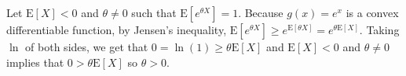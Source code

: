 \documentclass[12pt]{article}
\newcommand{\E}{\mathrm{E}}
\newenvironment{problem}[2][Problem]{\begin{trivlist}
\item[\hskip \labelsep {\bfseries #1}\hskip \labelsep {\bfseries #2}]}{\end{trivlist}}
\begin{document}
\begin{problem}{10.} Let $\E[X] < 0$ and $\theta \neq 0$ such that $\E[e^{\theta X}] = 1$. Because $g(x) = e^x$ is a convex differentiable function, by Jensen's inequality,  $\E[e^{\theta X}] \geq  e^{\E[\theta X]} = e^{\theta \E[X]}$. Taking $\ln$ of both sides, we get that $0 = \ln(1) \geq \theta\E[X]$ and $\E[X] < 0$ and $\theta \neq 0$ implies that $0 > \theta\E[X]$ so $\theta >0$. 
\end{problem}
\end{document}
